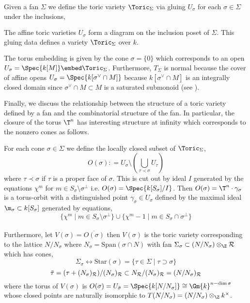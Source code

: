 \begin{definition}
Given a fan $\Sigma$ we define the toric variety $\Toric_\Sigma$ via gluing $U_\sigma$ for each $\sigma \in \Sigma$ under the inclusions,
\begin{center}
\end{center}
The affine toric varieties $U_{\sigma}$ form a diagram on the inclusion poset of $\Sigma$. This gluing data defines a variety $\Toric_\Sigma$ over $k$.
\end{definition}

\begin{rmk}
The torus embedding is given by the cone $\sigma = \{ 0 \}$ which corresponds to an open $U_\sigma = \Spec{k[M]} \embed \Toric_\Sigma$. Furthermore, $T_\Sigma$ is normal because the cover of affine opens $U_{\sigma} = \Spec{k[\sigma^\vee \cap M]}$ because $k[\sigma^\vee \cap M]$ is an integrally closed domain since $\sigma^\vee \cap M \subset M$ is a saturated submonoid (see \cite[Thm. 1.14 + Ex. 1.11]{cox_lectures}).
\end{rmk}

\noindent
Finally, we discuss the relationship between the structure of a toric variety defined by a fan and the combinatorial structure of the fan. In particular, the closure of the torus $\T^n$ has interesting structure at infinity which corresponds to the nonzero cones as follows.

\begin{prop}
For each cone $\sigma \in \Sigma$ we define the locally closed subset of $\Toric_\Sigma$,
\[ O(\sigma) : = U_\sigma \setminus \left( \bigcup_{\tau \prec \sigma} U_\tau \right) \]
where $\tau \prec \sigma$ if $\tau$ is a proper face of $\sigma$. This is cut out by ideal $I$ generated by the equations $\chi^m $ for $m \in S_\sigma \setminus \sigma^\perp$ i.e. $O(\sigma) = \Spec{k[S_\sigma]/I}$. Then $O(\sigma) = \T^n \cdot \gamma_\sigma$ is a torus-orbit with a distinguished point $\gamma_\sigma \in U_\sigma$ defined by the maximal ideal $\m_\sigma \subset k[S_\sigma]$ generated by equations,
 \[ \{ \chi^m \mid m \in S_\sigma \setminus \sigma^\perp \} \cup \{ \chi^m - 1 \mid m \in S_\sigma \cap \sigma^\perp \}  \]
\bigskip\\
Furthermore, let $V(\sigma) = \overline{O(\sigma)}$ then $V(\sigma)$ is the toric variety corresponding to the lattice $N / N_\sigma$ where $N_\sigma = \mathrm{Span}(\sigma \cap N)$ with fan $\Sigma_\sigma \subset (N/N_\sigma) \otimes_\Z \R$ which has cones,
\[ \Sigma_\sigma \leftrightarrow \mathrm{Star}(\sigma) = \{ \tau \in \Sigma \mid \tau \supset \sigma \} \]
\[ \bar{\tau} = (\tau + (N_\sigma)_{\mathcal{R}})/ (N_\sigma)_{\mathcal{R}} \subset N_{\mathcal{R}} / (N_\sigma)_{\mathcal{R}} = (N/ N_\sigma)_{\mathcal{R}} \]
where the torus of $V(\sigma)$ is $O(\sigma) = U_{\bar{\sigma}} = \Spec{k[N/N_\sigma]} \cong \Gm{k}^{n - \dim{\sigma}}$ whose closed points are naturally isomorphic to $T(N/N_\sigma) = (N / N_\sigma) \otimes_\Z k^\times$. 
\end{prop}

